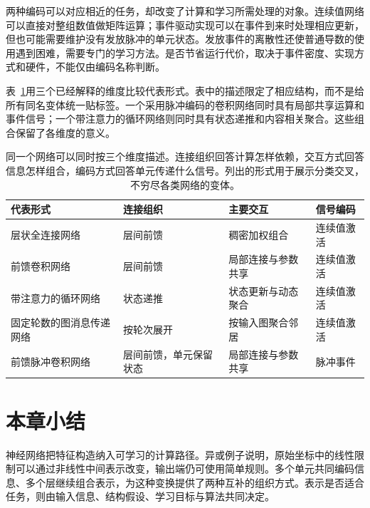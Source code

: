 两种编码可以对应相近的任务，却改变了计算和学习所需处理的对象。连续值网络可以直接对整组数值做矩阵运算；事件驱动实现可以在事件到来时处理相应更新，但也可能需要维护没有发放脉冲的单元状态。发放事件的离散性还使普通导数的使用遇到困难，需要专门的学习方法。是否节省运行代价，取决于事件密度、实现方式和硬件，不能仅由编码名称判断。

表~\ref{tab:neural-cross-classification}用三个已经解释的维度比较代表形式。表中的描述限定了相应结构，而不是给所有同名变体统一贴标签。一个采用脉冲编码的卷积网络同时具有局部共享运算和事件信号；一个带注意力的循环网络则同时具有状态递推和内容相关聚合。这些组合保留了各维度的意义。

\begin{table}[htbp]
  \centering
  \small
  \begin{tabularx}{\linewidth}{@{}>{\RaggedRight\arraybackslash}p{45mm}>{\RaggedRight\arraybackslash}p{42mm}>{\RaggedRight\arraybackslash}X>{\RaggedRight\arraybackslash}p{26mm}@{}}
    \toprule
    \textbf{代表形式} & \textbf{连接组织} & \textbf{主要交互} & \textbf{信号编码} \\
    \midrule
    层状全连接网络 & 层间前馈 & 稠密加权组合 & 连续值激活 \\
    前馈卷积网络 & 层间前馈 & 局部连接与参数共享 & 连续值激活 \\
    带注意力的循环网络 & 状态递推 & 状态更新与动态聚合 & 连续值激活 \\
    固定轮数的图消息传递网络 & 按轮次展开 & 按输入图聚合邻居 & 连续值激活 \\
    前馈脉冲卷积网络 & 层间前馈，单元保留状态 & 局部连接与参数共享 & 脉冲事件 \\
    \bottomrule
  \end{tabularx}
  \caption{同一个网络可以同时按三个维度描述。连接组织回答计算怎样依赖，交互方式回答信息怎样组合，编码方式回答单元传递什么信号。列出的形式用于展示分类交叉，不穷尽各类网络的变体。}
  \label{tab:neural-cross-classification}
\end{table}

\FloatBarrier
\section{本章小结}
\label{sec:neural-overview-summary}

神经网络把特征构造纳入可学习的计算路径。异或例子说明，原始坐标中的线性限制可以通过非线性中间表示改变，输出端仍可使用简单规则。多个单元共同编码信息、多个层继续组合表示，为这种变换提供了两种互补的组织方式。表示是否适合任务，则由输入信息、结构假设、学习目标与算法共同决定。

